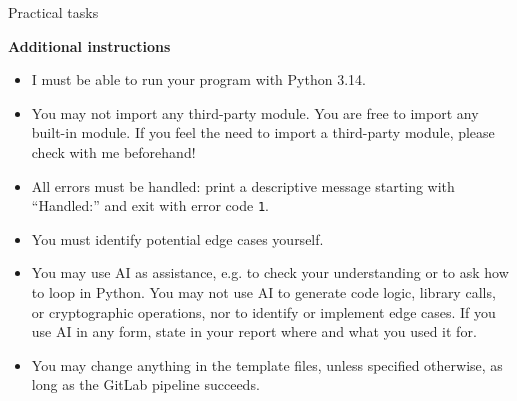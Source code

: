 \documentclass{homework}
\begin{document}
\begin{center}
  Practical tasks
\end{center}

\textbf{Additional instructions}

\begin{itemize}
  \item I must be able to run your program with Python 3.14\footnotemark{}.
  \item You may not import any third-party module.
  You are free to import any built-in module.
  If you feel the need to import a third-party module, please check with me beforehand!
  \item All errors must be handled: print a descriptive message starting with \enquote{Handled:} and exit with error code \texttt{1}.
  \item You must identify potential edge cases yourself.
  \item You may use AI as assistance, e.g. to check your understanding or to ask how to loop in Python.
  You may not use AI to generate code logic, library calls, or cryptographic operations, nor to identify or implement edge cases.
  If you use AI in any form, state in your report where and what you used it for.
  \item You may change anything in the template files, unless specified otherwise, as long as the GitLab pipeline succeeds.
\end{itemize}
\end{document}

